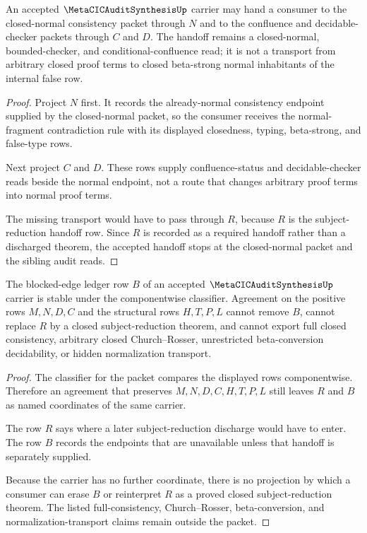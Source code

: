 \begin{theorem}
\label{thm:metacic-audit-synthesis-normal-consistency-handoff}
An accepted $\MetaCICAuditSynthesisUp$ carrier may hand a consumer to the closed-normal consistency packet through $N$ and to the confluence and decidable-checker packets through $C$ and $D$. The handoff remains a closed-normal, bounded-checker, and conditional-confluence read; it is not a transport from arbitrary closed proof terms to closed beta-strong normal inhabitants of the internal false row.
\end{theorem}
\begin{proof}
Project $N$ first. It records the already-normal consistency endpoint supplied by the closed-normal packet, so the consumer receives the normal-fragment contradiction rule with its displayed closedness, typing, beta-strong, and false-type rows.

Next project $C$ and $D$. These rows supply confluence-status and decidable-checker reads beside the normal endpoint, not a route that changes arbitrary proof terms into normal proof terms.

The missing transport would have to pass through $R$, because $R$ is the subject-reduction handoff row. Since $R$ is recorded as a required handoff rather than a discharged theorem, the accepted handoff stops at the closed-normal packet and the sibling audit reads.
\end{proof}

\begin{theorem}
\label{thm:metacic-audit-synthesis-blocked-edge-ledger}
The blocked-edge ledger row $B$ of an accepted $\MetaCICAuditSynthesisUp$ carrier is stable under the componentwise classifier. Agreement on the positive rows $M,N,D,C$ and the structural rows $H,T,P,L$ cannot remove $B$, cannot replace $R$ by a closed subject-reduction theorem, and cannot export full closed consistency, arbitrary closed Church--Rosser, unrestricted beta-conversion decidability, or hidden normalization transport.
\end{theorem}
\begin{proof}
The classifier for the packet compares the displayed rows componentwise. Therefore an agreement that preserves $M,N,D,C,H,T,P,L$ still leaves $R$ and $B$ as named coordinates of the same carrier.

The row $R$ says where a later subject-reduction discharge would have to enter. The row $B$ records the endpoints that are unavailable unless that handoff is separately supplied.

Because the carrier has no further coordinate, there is no projection by which a consumer can erase $B$ or reinterpret $R$ as a proved closed subject-reduction theorem. The listed full-consistency, Church--Rosser, beta-conversion, and normalization-transport claims remain outside the packet.
\end{proof}

